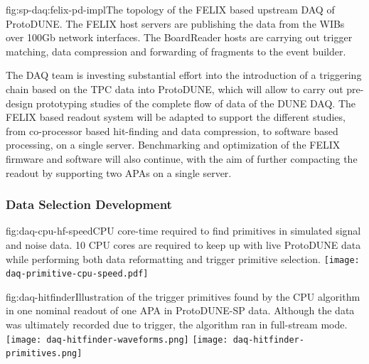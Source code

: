 \begin{dunefigure}{fig:sp-daq:felix-pd-impl}{The topology of the FELIX based
    upstream DAQ of ProtoDUNE. The FELIX host servers are publishing the data from the WIBs over 100Gb network interfaces. The BoardReader hosts are carrying out trigger matching, data compression and forwarding of fragments to the event builder.}
\end{dunefigure}

The DAQ team is investing substantial effort into the introduction of
a triggering chain based on the TPC data into ProtoDUNE, which will
allow to carry out pre-design prototyping studies of the complete flow
of data of the DUNE DAQ.  
The FELIX based readout system will be adapted to support the
different studies, from co-processor based hit-finding and data
compression, to software based processing, on a single
server. Benchmarking and optimization of the FELIX firmware and
software will also continue, with the aim of further compacting the
readout by supporting two APAs on a single server. 


\subsubsection{Data Selection Development}

\begin{dunefigure}{fig:daq-cpu-hf-speed}{CPU core-time required to find primitives in simulated signal and noise data.  10 CPU cores are required to keep up with live ProtoDUNE data while performing both data reformatting and trigger primitive selection.}
  \texttt{[image: daq-primitive-cpu-speed.pdf]}
\end{dunefigure}

\begin{dunefigure}{fig:daq-hitfinder}{Illustration of the trigger primitives found by the CPU algorithm in one nominal readout of one APA in ProtoDUNE-SP data.  Although the data was ultimately recorded due to trigger, the algorithm ran in full-stream mode.}
    \texttt{[image: daq-hitfinder-waveforms.png]}%
    \texttt{[image: daq-hitfinder-primitives.png]}
\end{dunefigure}

